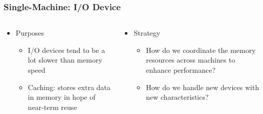 \begin{frame}[plain,t]
	\frametitle{Single-Machine: I/O Device }
	\begin{columns}[t]
		\begin{column}{.5\textwidth}
			
			\begin{itemize}\Large
				\item Purposes
				\begin{itemize}\large
					\item I/O devices tend to be a
					lot slower than memory
					speed
					\item Caching: stores extra
					data in memory in hope
					of near-term reuse
					
				\end{itemize}
			\end{itemize}
			
		\end{column}\pause
		
		\begin{column}{.5\textwidth}
			
			\begin{itemize}\Large
				\item Strategy
				\begin{itemize}\large
					\item How do we coordinate
					the memory resources
					across machines to
					enhance performance?
					\item How do we handle new
					devices with new
					characteristics?
				\end{itemize}
			\end{itemize}
			
		\end{column}
	\end{columns}
\end{frame}
